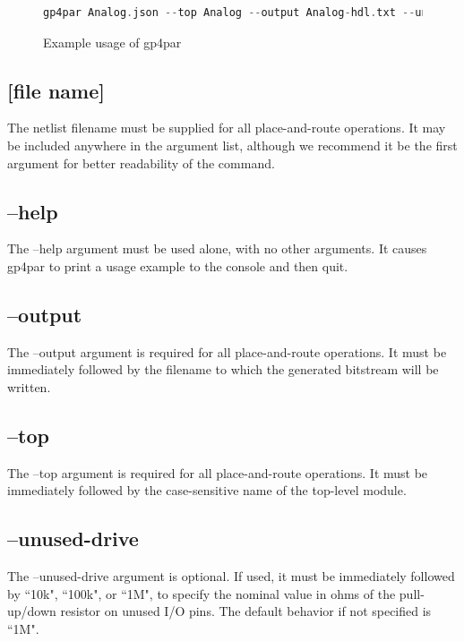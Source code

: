\documentclass{article}
\begin{document}
\begin{figure}[h]
\begin{lstlisting}[language=c]
gp4par Analog.json --top Analog --output Analog-hdl.txt --unused-pull down --unused-drive 10k
\end{lstlisting}
\caption{Example usage of gp4par}
\label{gp-cmd-example}
\end{figure}

\subsection{[file name]}

The netlist filename must be supplied for all place-and-route operations. It may be included anywhere in the argument 
list, although we recommend it be the first argument for better readability of the command.

\subsection{--help}

The --help argument must be used alone, with no other arguments. It causes gp4par to print a usage example to the 
console and then quit.

\subsection{--output}

The --output argument is required for all place-and-route operations. It must be immediately followed by the 
filename to which the generated bitstream will be written.

\subsection{--top}

The --top argument is required for all place-and-route operations. It must be immediately followed by the 
case-sensitive name of the top-level module.

\subsection{--unused-drive}

The --unused-drive argument is optional. If used, it must be immediately followed by ``10k", ``100k", or ``1M", to 
specify the nominal value in ohms of the pull-up/down resistor on unused I/O pins. The default behavior if not 
specified is ``1M".
\end{document}

